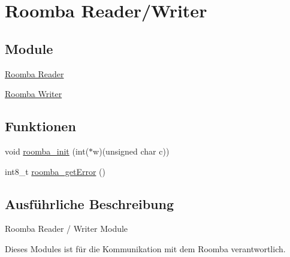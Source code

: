 \hypertarget{group__reader__writer}{\section{Roomba Reader/\-Writer}
\label{group__reader__writer}
}
\subsection*{Module}
\begin{DoxyCompactItemize}
\item 
\hyperlink{group__reader}{Roomba Reader}
\item 
\hyperlink{group__writer}{Roomba Writer}
\end{DoxyCompactItemize}
\subsection*{Funktionen}
\begin{DoxyCompactItemize}
\item 
void \hyperlink{group__reader__writer_gaa1694210db27c4eeb1999a64eb006d53}{roomba\-\_\-init} (int($\ast$w)(unsigned char c))
\item 
int8\-\_\-t \hyperlink{group__reader__writer_gac3bb53131af4f76e9f10b2270ef713f1}{roomba\-\_\-get\-Error} ()
\end{DoxyCompactItemize}


\subsection{Ausführliche Beschreibung}
Roomba Reader / Writer Module

Dieses Modules ist für die Kommunikation mit dem Roomba verantwortlich. 

